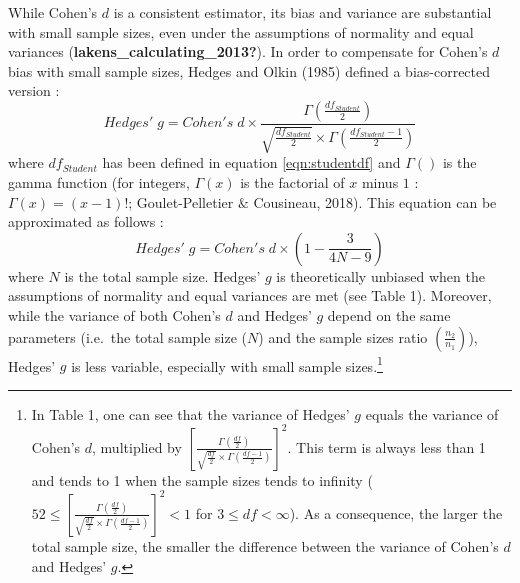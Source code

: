 \documentclass[
  english,
  man]{apa6}
\begin{document}
While Cohen's \(d\) is a consistent estimator, its bias and variance are substantial with small sample sizes, even under the assumptions of normality and equal variances (\textbf{lakens\_calculating\_2013?}). In order to compensate for Cohen's \(d\) bias with small sample sizes, Hedges and Olkin (1985) defined a bias-corrected version :
\begin{equation*} 
Hedges' \; g = Cohen's \; d \times \frac{\Gamma(\frac{df_{Student}}{2})}{\sqrt{\frac{df_{Student}}{2}} \times \Gamma(\frac{df_{Student}-1}{2})}
\label{eqn:Hedgesgs}
\end{equation*}
where \(df_{Student}\) has been defined in equation \ref{eqn:studentdf} and \(\Gamma()\) is the gamma function (for integers, \(\Gamma(x)\) is the factorial of \(x\) minus \(1\) : \(\Gamma(x)=(x-1)!\); Goulet-Pelletier \(\&\) Cousineau, 2018). This equation can be approximated as follows :
\begin{equation*} 
Hedges' \; g = Cohen's \; d \times \left( 1- \frac{3}{4N -9} \right)
\label{eqn:Hedgesgsapprox}
\end{equation*}
where \(N\) is the total sample size. Hedges' \(g\) is theoretically unbiased when the assumptions of normality and equal variances are met (see Table 1). Moreover, while the variance of both Cohen's \(d\) and Hedges' \(g\) depend on the same parameters (i.e.~the total sample size (\(N\)) and the sample sizes ratio \(\left(\frac{n_2}{n_1}\right)\)), Hedges' \(g\) is less variable, especially with small sample sizes.\footnote{In Table 1, one can see that the variance of Hedges' $g$ equals the variance of Cohen's $d$, multiplied by $\left[\frac{\Gamma(\frac{df}{2})}{\sqrt{\frac{df}{2}} \times \Gamma(\frac{df-1}{2})} \right] ^2$. This term is always less than 1 and tends to 1 when the sample sizes tends to infinity ($52 \le \left[\frac{\Gamma(\frac{df}{2})}{\sqrt{\frac{df}{2}} \times \Gamma(\frac{df-1}{2})} \right] ^2 < 1$ for $3 \le df < \infty$). As a consequence, the larger the total sample size, the smaller the difference between the variance of Cohen's $d$ and Hedges' $g$.}
\end{document}
